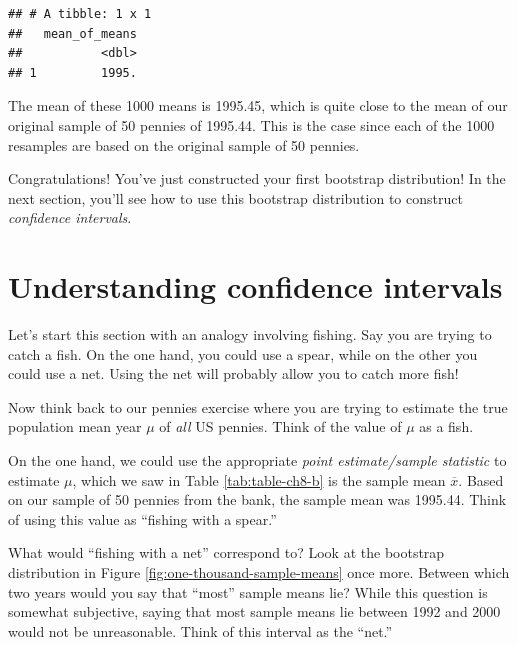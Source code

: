 \documentclass[
]{book}
\newenvironment{Shaded}{\begin{snugshade}}{\end{snugshade}}
\newcommand{\DataTypeTok}[1]{\textcolor[rgb]{0.13,0.29,0.53}{#1}}
\newcommand{\KeywordTok}[1]{\textcolor[rgb]{0.13,0.29,0.53}{\textbf{#1}}}
\newcommand{\NormalTok}[1]{#1}
\newcommand{\OperatorTok}[1]{\textcolor[rgb]{0.81,0.36,0.00}{\textbf{#1}}}
\newcommand{\StringTok}[1]{\textcolor[rgb]{0.31,0.60,0.02}{#1}}
\begin{document}
\begin{Shaded}
\end{Shaded}

\begin{verbatim}
## # A tibble: 1 x 1
##   mean_of_means
##           <dbl>
## 1         1995.
\end{verbatim}

The mean of these 1000 means is 1995.45, which is quite close to the mean of our original sample of 50 pennies of 1995.44. This is the case since each of the 1000 resamples are based on the original sample of 50 pennies.

Congratulations! You've just constructed your first bootstrap distribution! In the next section, you'll see how to use this bootstrap distribution to construct \emph{confidence intervals}.

\hypertarget{ci-build-up}{%
\section{Understanding confidence intervals}\label{ci-build-up}}

Let's start this section with an analogy involving fishing. Say you are trying to catch a fish. On the one hand, you could use a spear, while on the other you could use a net. Using the net will probably allow you to catch more fish!

Now think back to our pennies exercise where you are trying to estimate the true population mean year \(\mu\) of \emph{all} US pennies.  Think of the value of \(\mu\) as a fish.

On the one hand, we could use the appropriate \emph{point estimate/sample statistic} to estimate \(\mu\), which we saw in Table \ref{tab:table-ch8-b} is the sample mean \(\overline{x}\). Based on our sample of 50 pennies from the bank, the sample mean was 1995.44. Think of using this value as ``fishing with a spear.''

What would ``fishing with a net'' correspond to? Look at the bootstrap distribution in Figure \ref{fig:one-thousand-sample-means} once more. Between which two years would you say that ``most'' sample means lie? While this question is somewhat subjective, saying that most sample means lie between 1992 and 2000 would not be unreasonable. Think of this interval as the ``net.''
\end{document}
